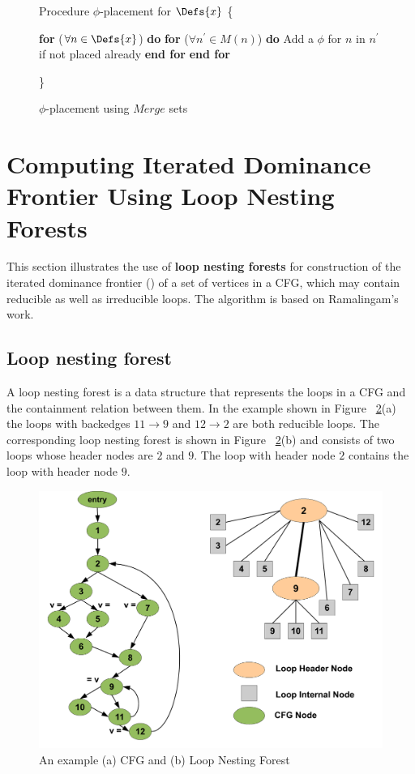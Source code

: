 {\begin{figure}[!ht]
\begin{minipage}[t]{5in}
\setcounter{linectr}{0}

Procedure $\phi$-placement for $\Defs{x}$
\{
\begin{code}
 {\bf for} ($\forall n \in \Defs{x}$) {\bf do}
   {\bf for} ($\forall n^{'} \in M(n)$) {\bf do}
       Add a $\phi$ for $n$ in $n^{'}$ if not placed already
   {\bf end for}
 {\bf end for}
\end{code}
\}
\end{minipage}
\caption{$\phi$-placement using $Merge$ sets}
\label{F:phip}
\end{figure} 


\section{Computing Iterated Dominance Frontier Using Loop Nesting Forests}
\label{section:alternative_ssa_construction_algorithms:loop}
This section illustrates the use of {\bf loop nesting forests} for construction of the iterated dominance frontier (\iDF) of a set of vertices in a CFG, which may contain reducible as well as
irreducible loops. The algorithm is based on Ramalingam's work.

    \subsection{Loop nesting forest}
     A loop nesting forest is a data structure that represents the loops in a CFG and the containment relation between them. In the example shown in Figure ~\ref{fig:lnf}(a) the loops with backedges $11 \rightarrow 9$ and $12 \rightarrow 2$ are both reducible loops. The corresponding loop nesting forest is shown in Figure ~\ref{fig:lnf}(b) and consists of two loops whose header nodes are $2$ and $9$. The loop with header node $2$ contains the loop with header node $9$.

    \begin{figure}[htb]
    \centerline{\includegraphics[scale=0.3]{lnfred.pdf}}
    \caption{An example (a) CFG and (b) Loop Nesting Forest }
    \label{fig:lnf}
    \end{figure} 


}
